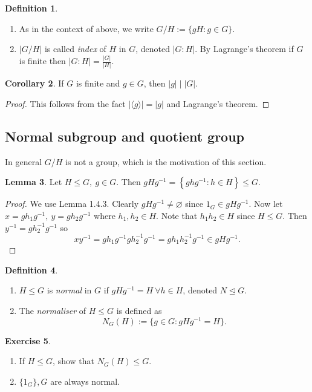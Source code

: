 \documentclass[a4paper]{article}
\theoremstyle{definition}
\newtheorem{defn}{Definition}[subsection]
\newtheorem{lemma}[defn]{Lemma}
\newtheorem{coro}[defn]{Corollary}
\newtheorem{exe}[defn]{Exercise}
\begin{document}
\begin{defn}
\begin{enumerate}
\item As in the context of above, we write $G/H:=\{gH:g\in G\}$.
\item $|G/H|$ is called \textit{index} of $H$ in $G$, denoted $|G:H|$. By Lagrange's theorem if $G$ is finite then $|G:H|=\frac{|G|}{|H|}$.
\end{enumerate}
\end{defn}
\begin{coro}
If $G$ is finite and $g\in G$, then $|g|\mid |G|$.
\end{coro}
\begin{proof}
This follows from the fact $|\langle g\rangle |=|g|$ and Lagrange's theorem.
\end{proof}

\subsection{Normal subgroup and quotient group}
In general $G/H$ is not a group, which is the motivation of this section.
\begin{lemma}
Let $H\leq G,\ g\in G$. Then $gHg^{-1}=\left\{ghg^{-1}:h\in H\right\} \leq G$.
\end{lemma}
\begin{proof}
We use Lemma 1.4.3. Clearly $gHg^{-1}\neq \varnothing$ since $1_G\in gHg^{-1}$. Now let $x=gh_1g^{-1},\ y=gh_2g^{-1}$ where $h_1,h_2\in H$. Note that $h_1h_2\in H$ since $H\leq G$. Then $y^{-1}=gh_2^{-1}g^{-1}$ so
\[
xy^{-1}=gh_1g^{-1}gh_2^{-1}g^{-1}=gh_1h_2^{-1}g^{-1} \in gHg^{-1}.
\]
\end{proof}
\begin{defn}
\begin{enumerate}
\item $H\leq G$ is \textit{normal} in $G$ if $gHg^{-1}=H \ \forall h\in H$, denoted $N\unlhd G$.
\item The \textit{normaliser} of $H\leq G$ is defined as
\[
N_G(H):=\{g\in G:gHg^{-1}=H\}.
\]
\end{enumerate}
\end{defn}
\begin{exe}
\begin{enumerate}
\item If $H\leq G$, show that $N_G(H)\leq G$.
\item $\{1_G\},G$ are always normal.
\end{enumerate}
\end{exe}
\end{document}
